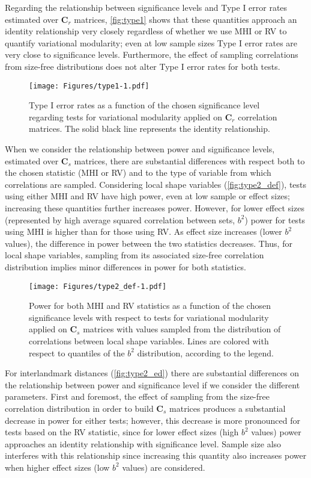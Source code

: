 \documentclass[12pt,]{article}
\begin{document}
Regarding the relationship between significance levels and Type I error
rates estimated over $\mathbf{C}_r$ matrices, \autoref{fig:type1} shows
that these quantities approach an identity relationship very closely
regardless of whether we use MHI or RV to quantify variational
modularity; even at low sample sizes Type I error rates are very close
to significance levels. Furthermore, the effect of sampling correlations
from size-free distributions does not alter Type I error rates for both
tests.

\begin{figure}[htbp]
\centering
\texttt{[image: Figures/type1-1.pdf]}
\caption{Type I error rates as a function of the chosen significance
level regarding tests for variational modularity applied on
$\mathbf{C}_r$ correlation matrices. The solid black line represents the
identity relationship. \label{fig:type1}}
\end{figure}

When we consider the relationship between power and significance levels,
estimated over $\mathbf{C}_s$ matrices, there are substantial
differences with respect both to the chosen statistic (MHI or RV) and to
the type of variable from which correlations are sampled. Considering
local shape variables (\autoref{fig:type2_def}), tests using either MHI
and RV have high power, even at low sample or effect sizes; increasing
these quantities further increases power. However, for lower effect
sizes (represented by high average squared correlation between sets,
$b^2$) power for tests using MHI is higher than for those using RV. As
effect size increases (lower $b^2$ values), the difference in power
between the two statistics decreases. Thus, for local shape variables,
sampling from its associated size-free correlation distribution implies
minor differences in power for both statistics.

\begin{figure}[htbp]
\centering
\texttt{[image: Figures/type2\_def-1.pdf]}
\caption{Power for both MHI and RV statistics as a function of the
chosen significance levels with respect to tests for variational
modularity applied on $\mathbf{C}_s$ matrices with values sampled from
the distribution of correlations between local shape variables. Lines
are colored with respect to quantiles of the $b^2$ distribution,
according to the legend. \label{fig:type2_def}}
\end{figure}

For interlandmark distances (\autoref{fig:type2_ed}) there are
substantial differences on the relationship between power and
significance level if we consider the different parameters. First and
foremost, the effect of sampling from the size-free correlation
distribution in order to build $\mathbf{C}_s$ matrices produces a
substantial decrease in power for either tests; however, this decrease
is more pronounced for tests based on the RV statistic, since for lower
effect sizes (high $b^2$ values) power approaches an identity
relationship with significance level. Sample size also interferes with
this relationship since increasing this quantity also increases power
when higher effect sizes (low $b^2$ values) are considered.
\end{document}
